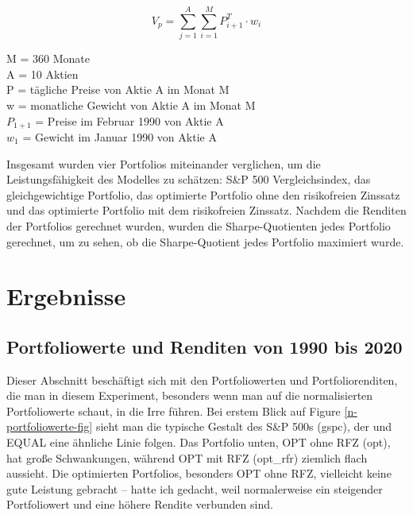 \documentclass[12pt]{article}
\begin{document}
            \newpage
            \begin{Large} \[ V_p = \sum_{j=1}^{A}\sum_{i=1}^{M}P^T_{i+1} \cdot w_i \] \end{Large}

            \begin{multicols}{2}
                \begin{footnotesize}
                    
                    \noindent M = 360 Monate \\
                    A = 10 Aktien \\
                    P = tägliche Preise von Aktie A im Monat M \\
                    w = monatliche Gewicht von Aktie A im Monat M \\
                    $P_{1+1}$ = Preise im Februar 1990 von Aktie A \\
                    $w_1$ = Gewicht im Januar 1990 von Aktie A 

                \end{footnotesize}
            \end{multicols}

            Insgesamt wurden vier Portfolios miteinander verglichen, 
            um die Leistungsfähigkeit des Modelles zu schätzen: S\&P 500 Vergleichsindex, 
            das gleichgewichtige Portfolio, das optimierte Portfolio ohne den risikofreien Zinssatz und 
            das optimierte Portfolio mit dem risikofreien Zinssatz. Nachdem die Renditen der Portfolios gerechnet wurden, 
            wurden die Sharpe-Quotienten jedes Portfolio gerechnet, um zu sehen, ob die Sharpe-Quotient jedes Portfolio maximiert wurde.

    \section{Ergebnisse}
    
        \subsection{Portfoliowerte und Renditen von 1990 bis 2020}

            Dieser Abschnitt beschäftigt sich mit den Portfoliowerten und Portfoliorenditen, 
            die man in diesem Experiment, besonders wenn man auf die normalisierten Portfoliowerte schaut, 
            in die Irre führen. Bei erstem Blick auf Figure \ref{n-portfoliowerte-fig} sieht man die typische Gestalt des S\&P 500s (gspc), 
            der und EQUAL eine ähnliche Linie folgen. Das Portfolio unten, OPT ohne RFZ (opt), 
            hat große Schwankungen, während OPT mit RFZ (opt\_rfr) ziemlich flach aussieht. Die optimierten Portfolios, 
            besonders OPT ohne RFZ, vielleicht keine gute Leistung gebracht -- hatte ich gedacht, 
            weil normalerweise ein steigender Portfoliowert und eine höhere Rendite verbunden sind. 
\end{document}
